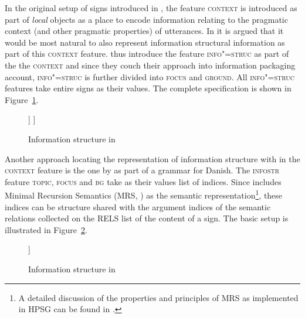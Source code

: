 \documentclass[output=paper]{langsci/langscibook}
\begin{document}
In the original setup of signs introduced in \cite{ps2}, the feature
\textsc{context} is introduced as part of \textit{local} objects as a
place to encode information relating to the pragmatic context (and
other pragmatic properties) of utterances. In \cite{EV96a} it is
argued that it would be most natural to also represent information
structural information as part of this \textsc{context}
feature. \cite{EV96a} thus introduce the feature \textsc{info"=struc}
as part of the the \textsc{context} and since they couch their
approach into \cite{vallduvi:92} information packaging account,
\textsc{info"=struc} is further divided into \textsc{focus} and
\textsc{ground}. All \textsc{info"=struc} features take entire signs as
their values. The complete specification is shown in
Figure~\ref{fig:e-v-info-struc}.

\begin{figure}[htb!]
  \begin{center}
        \leavevmode
    \begin{avm}
    [\tp{sign}\\
     synsem|local|context|info-struc & [focus & sign\\
                                        ground & [link & sign\\
                                                  tail & sign]
                                       ]
    ]     
    \end{avm}
    \caption{Information structure in \cite{EV96a}}
    \label{fig:e-v-info-struc}
  \end{center}
\end{figure}

Another approach locating the representation of information structure
with in the \textsc{context} feature is the one by
\cite{Paggio2009a-u} as part of a grammar for Danish. The
\textsc{infostr} feature \textsc{topic}, \textsc{focus} and
\textsc{bg} take as their values list of indices. Since
\cite{Paggio2009a-u} includes Minimal Recursion Semantics (MRS,
\citep{CFPS2005a}) as the semantic representation\footnote{A detailed
  discussion of the properties and principles of MRS as implemented in
  HPSG can be found in .}, these indices
can be structure shared with the argument indices of the semantic
relations collected on the \textsc{RELS} list of the content of a
sign. The basic setup is illustrated in
Figure~\ref{fig:paggio-infostr}.
\begin{figure}[htb]
  \centering
        \leavevmode
    \begin{avm}
    [\tp{sign}\\
     synsem|local|context|infostr & [focus & list-of-indices\\
                                     topic & list-fo-indices\\
                                     bg & list-of-indices]
    ]     
    \end{avm}
  \caption{Information structure in \cite{Paggio2009a-u}}
  \label{fig:paggio-infostr}
\end{figure}
\end{document}
